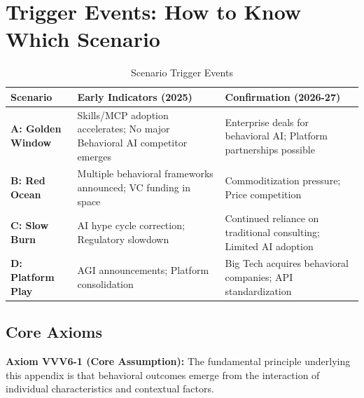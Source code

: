\section{Trigger Events: How to Know Which Scenario}
\label{sec:vvv-triggers}

\begin{table}[htbp]
\centering
\caption{Scenario Trigger Events}
\label{tab:vvv-triggers}
\renewcommand{\arraystretch}{1.3}
\begin{tabular}{@{}lp{5cm}p{5cm}@{}}
\toprule
\textbf{Scenario} & \textbf{Early Indicators (2025)} & \textbf{Confirmation (2026-27)} \\
\midrule
\textbf{A: Golden Window} &
Skills/MCP adoption accelerates; No major Behavioral AI competitor emerges &
Enterprise deals for behavioral AI; Platform partnerships possible \\
\midrule
\textbf{B: Red Ocean} &
Multiple behavioral frameworks announced; VC funding in space &
Commoditization pressure; Price competition \\
\midrule
\textbf{C: Slow Burn} &
AI hype cycle correction; Regulatory slowdown &
Continued reliance on traditional consulting; Limited AI adoption \\
\midrule
\textbf{D: Platform Play} &
AGI announcements; Platform consolidation &
Big Tech acquires behavioral companies; API standardization \\
\bottomrule
\end{tabular}
\end{table}




\subsection{Core Axioms}
\label{sec:vvv6-axioms}

\begin{tcolorbox}[colback=yellow!5!white,colframe=yellow!75!black,title=Axiom VVV6-1: Fundamental Principle]
\textbf{Axiom VVV6-1 (Core Assumption):}
The fundamental principle underlying this appendix is that behavioral outcomes
emerge from the interaction of individual characteristics and contextual factors.
\end{tcolorbox}

